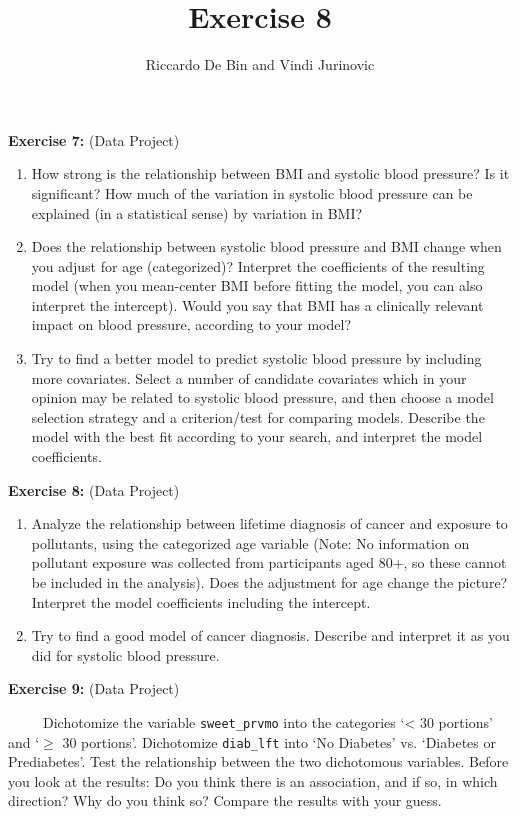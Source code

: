 \documentclass[]{article}
\title{Exercise 8}
\author{Riccardo De Bin and Vindi Jurinovic}
\date{}
\begin{document}
\maketitle


\textbf{Exercise 7:} (Data Project)

\begin{enumerate}
\def\labelenumi{\alph{enumi})}
\item
  How strong is the relationship between BMI and systolic blood
  pressure? Is it significant? How much of the variation in systolic
  blood pressure can be explained (in a statistical sense) by variation
  in BMI?
\item
  Does the relationship between systolic blood pressure and BMI change
  when you adjust for age (categorized)? Interpret the coefficients of
  the resulting model (when you mean-center BMI before fitting the
  model, you can also interpret the intercept). Would you say that BMI
  has a clinically relevant impact on blood pressure, according to your
  model?
\item
  Try to find a better model to predict systolic blood pressure by
  including more covariates. Select a number of candidate covariates
  which in your opinion may be related to systolic blood pressure, and
  then choose a model selection strategy and a criterion/test for
  comparing models. Describe the model with the best fit according to
  your search, and interpret the model coefficients.
\end{enumerate}

\textbf{Exercise 8:} (Data Project)

\begin{enumerate}
\def\labelenumi{\alph{enumi})}
\item
  Analyze the relationship between lifetime diagnosis of cancer and
  exposure to pollutants, using the categorized age variable (Note: No
  information on pollutant exposure was collected from participants aged
  80+, so these cannot be included in the analysis). Does the adjustment
  for age change the picture? Interpret the model coefficients including
  the intercept.
\item
  Try to find a good model of cancer diagnosis. Describe and interpret
  it as you did for systolic blood pressure.
\end{enumerate}

\textbf{Exercise 9:} (Data Project)

~~~~~Dichotomize the variable \texttt{sweet\_prvmo} into the categories
`\textless{} 30 portions' and `$\geq$ 30 portions'. Dichotomize
\texttt{diab\_lft} into `No Diabetes' vs. `Diabetes or Prediabetes'.
Test the relationship between the two dichotomous variables. Before you
look at the results: Do you think there is an association, and if so, in
which direction? Why do you think so? Compare the results with your
guess.
\end{document}
